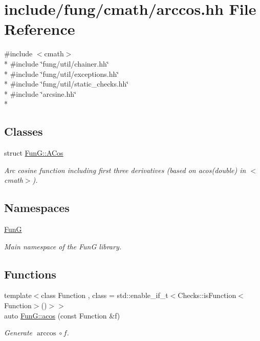 \hypertarget{arccos_8hh}{\section{include/fung/cmath/arccos.hh File Reference}
\label{arccos_8hh}
}
{\ttfamily \#include $<$cmath$>$}\\*
{\ttfamily \#include \char`\"{}fung/util/chainer.\-hh\char`\"{}}\\*
{\ttfamily \#include \char`\"{}fung/util/exceptions.\-hh\char`\"{}}\\*
{\ttfamily \#include \char`\"{}fung/util/static\-\_\-checks.\-hh\char`\"{}}\\*
{\ttfamily \#include \char`\"{}arcsine.\-hh\char`\"{}}\\*
\subsection*{Classes}
\begin{DoxyCompactItemize}
\item 
struct \hyperlink{structFunG_1_1ACos}{Fun\-G\-::\-A\-Cos}
\begin{DoxyCompactList}\small\item\em Arc cosine function including first three derivatives (based on acos(double) in $<$cmath$>$). \end{DoxyCompactList}\end{DoxyCompactItemize}
\subsection*{Namespaces}
\begin{DoxyCompactItemize}
\item 
\hyperlink{namespaceFunG}{Fun\-G}
\begin{DoxyCompactList}\small\item\em Main namespace of the Fun\-G library. \end{DoxyCompactList}\end{DoxyCompactItemize}
\subsection*{Functions}
\begin{DoxyCompactItemize}
\item 
{\footnotesize template$<$class Function , class  = std\-::enable\-\_\-if\-\_\-t$<$\-Checks\-::is\-Function$<$\-Function$>$()$>$$>$ }\\auto \hyperlink{group__CMathGroup_gae9b7d3a479bcd8d48cf25f1c29edefb9}{Fun\-G\-::acos} (const Function \&f)
\begin{DoxyCompactList}\small\item\em Generate $ \arccos\circ f $. \end{DoxyCompactList}\end{DoxyCompactItemize}

